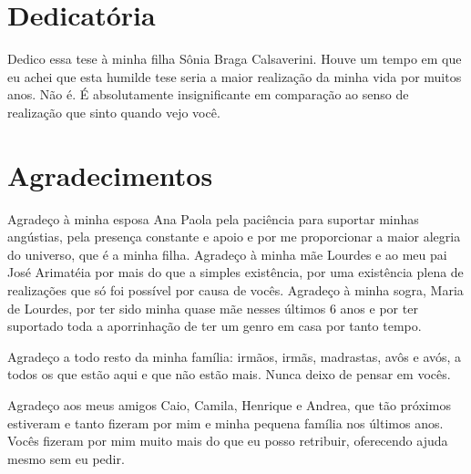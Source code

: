 \begin{titlepage}

\chapter*{Dedicatória}

Dedico essa tese à minha filha Sônia Braga Calsaverini. Houve um tempo em que eu achei que esta humilde tese seria a maior realização da minha vida  por muitos anos. Não é. É absolutamente insignificante em comparação ao senso de realização que sinto quando vejo você. 

\chapter*{Agradecimentos}

Agradeço à minha esposa Ana Paola pela paciência para suportar minhas angústias, pela presença constante e apoio e por me proporcionar a maior alegria do universo, que é a minha filha. Agradeço à minha mãe Lourdes e ao meu pai José Arimatéia por mais do que a simples existência, por uma existência plena de realizações que só foi possível por causa de vocês. Agradeço à minha sogra, Maria de Lourdes, por ter sido minha quase mãe nesses últimos 6 anos e por ter suportado toda a aporrinhação de ter um genro em casa por tanto tempo.

Agradeço a todo resto da minha família: irmãos, irmãs, madrastas, avôs e avós, a todos os que estão aqui e que não estão mais. Nunca deixo de pensar em vocês. 

Agradeço aos meus amigos Caio, Camila, Henrique e Andrea, que tão próximos estiveram e tanto fizeram por mim e minha pequena família nos últimos anos. Vocês fizeram por mim muito mais do que eu posso retribuir, oferecendo ajuda mesmo sem eu pedir.

\end{titlepage}